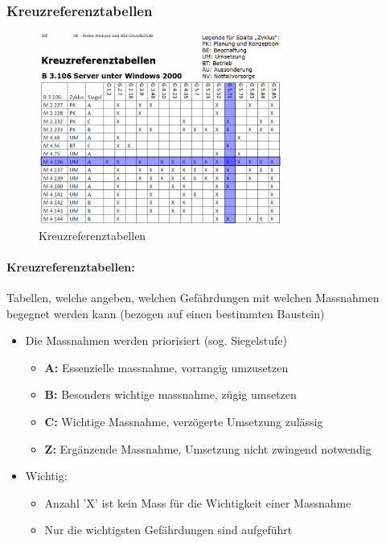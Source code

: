 \documentclass[10pt,a4paper]{article}
\begin{document}
\subsubsection*{Kreuzreferenztabellen}
\begin{figure}[H]
    \begin{center}
    \includegraphics[width=8cm]{images/Kreuzreferenztabellen.png}
    \caption{Kreuzreferenztabellen}
    \label{Kreuzreferenztabellen}
    \end{center}
\end{figure}

\paragraph*{Kreuzreferenztabellen:}Tabellen, welche angeben, welchen Gefährdungen mit welchen Massnahmen begegnet werden kann (bezogen auf einen bestimmten Baustein)

\begin{itemize}[noitemsep,topsep=0pt,leftmargin=*]
    \item Die Massnahmen werden priorisiert (sog. Siegelstufe)
    \begin{itemize}[noitemsep,topsep=0pt,leftmargin=*]
        \item \textbf{A:} Essenzielle massnahme, vorrangig umzusetzen
        \item \textbf{B:} Besonders wichtige massnahme, zügig umsetzen
        \item \textbf{C:} Wichtige Massnahme, verzögerte Umsetzung zulässig
        \item \textbf{Z:} Ergänzende Massnahme, Umsetzung nicht zwingend notwendig
    \end{itemize}
    \item Wichtig:
    \begin{itemize}[noitemsep,topsep=0pt,leftmargin=*]
        \item Anzahl 'X' ist kein Mass für die Wichtigkeit einer Massnahme
        \item Nur die wichtigsten Gefährdungen sind aufgeführt
    \end{itemize}
\end{itemize}
\end{document}

